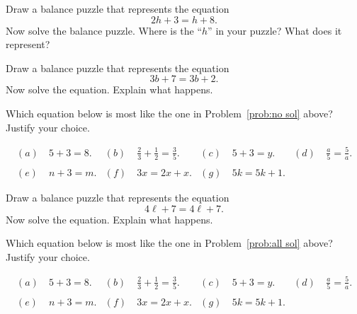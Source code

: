 \bigskip


\begin{problem}
Draw a balance puzzle that represents the equation 
\[
2h + 3 = h + 8.
\]
 Now solve the balance puzzle. Where is the ``$h$'' in your puzzle?  What does it represent? 
\end{problem}

\bigskip


\begin{problem}\label{prob:no sol}
Draw a balance puzzle that represents the equation 
\[
3b + 7 = 3b + 2.
\]
 Now solve the equation. Explain what happens. 
 \end{problem}
 
 
\bigskip

\begin{problem}
Which equation below is most like the one in Problem~\ref{prob:no sol} above?  Justify your choice.

\begin{align*}
(a) &\ 5 + 3 = 8.
&
(b) &\ \frac 23 + \frac 12 = \frac 35.
&
(c) & \ 5 + 3 = y.
& (d)& \ 
\frac a 5 = \frac 5 a.
\\
\\
(e) & \ n + 3 = m.
&
(f) & \ 3x = 2x + x.
&
(g)& \ 
5k = 5k + 1.
\end{align*}

\end{problem}


\bigskip


\begin{problem}\label{prob:all sol}
Draw a balance puzzle that represents the equation 
\[
4\ell +7  = 4\ell + 7.
\]
 Now solve the equation. Explain what happens. 
 \end{problem}
 
 
\bigskip

\begin{problem}
Which equation below is most like the one in Problem~\ref{prob:all sol} above?  Justify your choice.

\begin{align*}
(a) &\ 5 + 3 = 8.
&
(b) &\ \frac 23 + \frac 12 = \frac 35.
&
(c) & \ 5 + 3 = y.
& (d)& \ 
\frac a 5 = \frac 5 a.
\\
\\
(e) & \ n + 3 = m.
&
(f) & \ 3x = 2x + x.
&
(g)& \ 
5k = 5k + 1.
\end{align*}

\end{problem}

\bigskip


